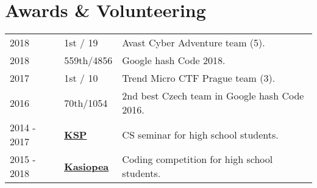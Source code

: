 \documentclass[a4paper]{deedy-resume} %
\begin{document}
\begin{minipage}[t]{0.62\textwidth}
\sectionspace %





\section{Awards \& Volunteering} 

\begin{tabular}{lll}
2018 & 1st / 19 & Avast Cyber Adventure team (5). \\
2018 & 559th/4856 & Google hash Code 2018. \\
2017 & 1st / 10 & Trend Micro CTF Prague team (3). \\
2016 & 70th/1054 & 2nd best Czech team in Google hash Code 2016. \\
2014 - 2017 & \href{https://ksp.mff.cuni.cz/}{\bf KSP} & CS seminar for high school students. \\
2015 - 2018 & \href{https://kasiopea.matfyz.cz/}{\bf Kasiopea} & Coding competition for high school students. \\
\end{tabular}

\sectionspace %



\sectionspace %


\end{minipage} %
\end{document}
